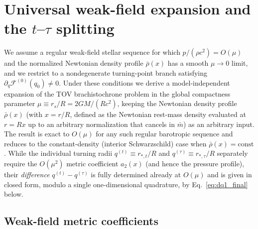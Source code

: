 \documentclass[
  aps,
  prd,
  twocolumn,
  nofootinbib,
  superscriptaddress,
  longbibliography
]{revtex4-2}
\begin{document}
\section{Universal weak-field expansion and the $t$--$\tau$ splitting}
\label{sec:weak_field}

We assume a regular weak-field stellar sequence for which
$p/(\rho c^2)=O(\mu)$ and the normalized Newtonian density profile
$\bar\rho(x)$ has a smooth $\mu\to0$ limit, and we restrict to a
nondegenerate turning-point branch satisfying
$\partial_q\mathcal{F}^{(0)}(q_0)\ne0$. Under these conditions we derive
a model-independent expansion of the TOV brachistochrone problem in the
global compactness parameter $\mu\equiv r_s/R=2GM/(Rc^2)$, keeping the
Newtonian density profile $\bar\rho(x)$ (with $x=r/R$, defined as the
Newtonian rest-mass density evaluated at $r=Rx$ up to an arbitrary
normalization that cancels in $\bar m$) as an arbitrary input. The
result is exact to $O(\mu)$ for any such regular barotropic sequence and
reduces to the constant-density (interior Schwarzschild) case when
$\bar\rho(x)=\mathrm{const}$. While the individual turning radii $q^{(t)}\equiv
r_{*,t}/R$ and $q^{(\tau)}\equiv r_{*,\tau}/R$ separately require the
$O(\mu^2)$ metric coefficient $a_2(x)$ (and hence the pressure profile),
their \emph{difference} $q^{(t)}-q^{(\tau)}$ is fully determined already
at $O(\mu)$ and is given in closed form, modulo a single one-dimensional
quadrature, by Eq.~\eqref{eq:dq1_final} below.

\subsection{Weak-field metric coefficients}
\end{document}
